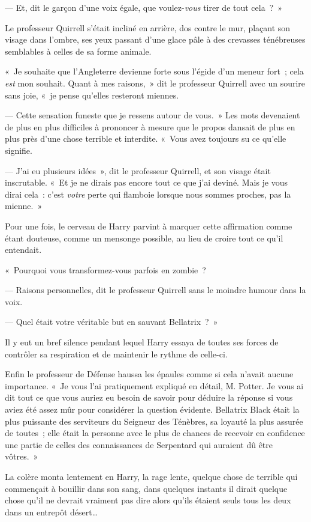 --- Et, dit le garçon d'une voix égale, que voulez-\emph{vous} tirer de tout cela~?~»

Le professeur Quirrell s'était incliné en arrière, dos contre le mur, plaçant son visage dans l'ombre, ses yeux passant d'une glace pâle à des crevasses ténébreuses semblables à celles de sa forme animale.

«~Je souhaite que l'Angleterre devienne forte sous l'égide d'un meneur fort~; cela \emph{est} mon souhait.
Quant à mes raisons,~» dit le professeur Quirrell avec un sourire sans joie, «~je pense qu'elles resteront miennes.

--- Cette sensation funeste que je ressens autour de vous.~»
Les mots devenaient de plus en plus difficiles à prononcer à mesure que le propos dansait de plus en plus près d'une chose terrible et interdite.
«~Vous avez toujours su ce qu'elle signifie.

--- J'ai eu plusieurs idées~», dit le professeur Quirrell, et son visage était inscrutable.
«~Et je ne dirais pas encore tout ce que j'ai deviné.
Mais je vous dirai cela~: c'est \emph{votre} perte qui flamboie lorsque nous sommes proches, pas la mienne.~»

Pour une fois, le cerveau de Harry parvint à marquer cette affirmation comme étant douteuse, comme un mensonge possible, au lieu de croire tout ce qu'il entendait.

«~Pourquoi vous transformez-vous parfois en zombie~?

--- Raisons personnelles, dit le professeur Quirrell sans le moindre humour dans la voix.

--- Quel était votre véritable but en sauvant Bellatrix~?~»

Il y eut un bref silence pendant lequel Harry essaya de toutes ses forces de contrôler sa respiration et de maintenir le rythme de celle-ci.

Enfin le professeur de Défense haussa les épaules comme si cela n'avait aucune importance.
«~Je vous l'ai pratiquement expliqué en détail, M. Potter.
Je vous ai dit tout ce que vous auriez eu besoin de savoir pour déduire la réponse si vous aviez été assez mûr pour considérer la question évidente.
Bellatrix Black était la plus puissante des serviteurs du Seigneur des Ténèbres, sa loyauté la plus assurée de toutes~; elle était la personne avec le plus de chances de recevoir en confidence une partie de celles des connaissances de Serpentard qui auraient dû être vôtres.~»

La colère monta lentement en Harry, la rage lente, quelque chose de terrible qui commençait à bouillir dans son sang, dans quelques instants il dirait quelque chose qu'il ne devrait vraiment pas dire alors qu'ils étaient seuls tous les deux dans un entrepôt désert…

